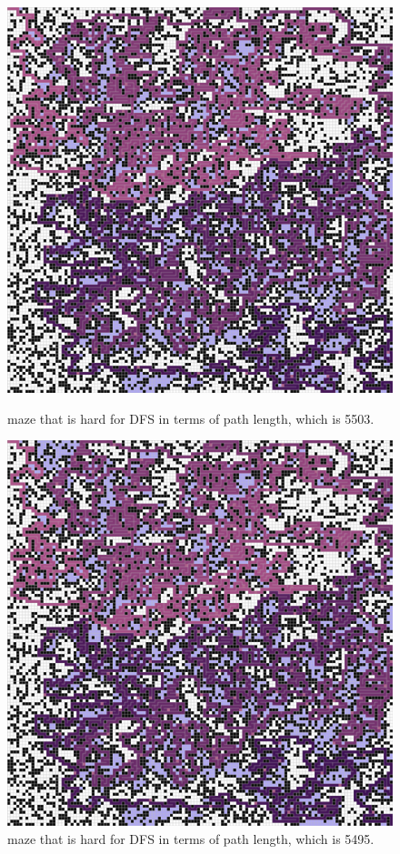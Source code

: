 \documentclass[letter]{article}
\begin{document}
\begin{enumerate}[resume]
\begin{enumerate}
\begin{enumerate}
\begin{figure}
							\includegraphics[width=\textwidth]{../pics/dp/5503.png}
							\caption{\label{fig:dp2}maze that is hard for DFS in terms of path length, which is 5503.}
						\endminipage\hfill
							\includegraphics[width=\textwidth]{../pics/dp/5495.png}
							\caption{\label{fig:dp3}maze that is hard for DFS in terms of path length, which is 5495.}
						\endminipage
					\endminipage
					

\end{figure}
\end{enumerate}
\end{enumerate}
\end{enumerate}
\end{document}
